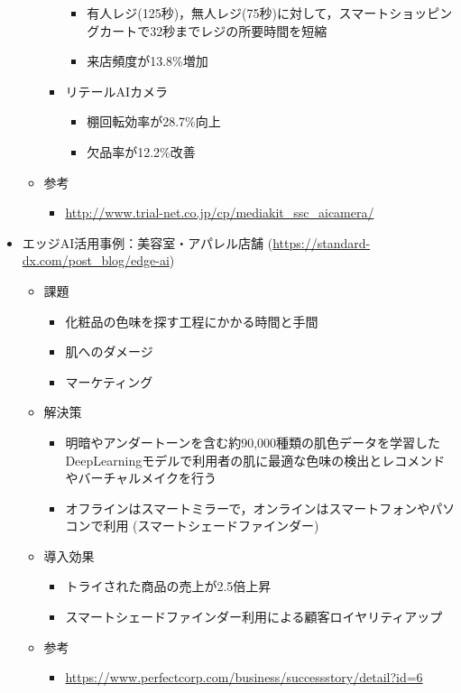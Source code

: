 \begin{itemize}
\begin{itemize}
\begin{itemize}
\begin{itemize}
				\item 有人レジ(125秒)，無人レジ(75秒)に対して，スマートショッピングカートで32秒までレジの所要時間を短縮
				\item 来店頻度が13.8\%増加
			\end{itemize}
			\item リテールAIカメラ
			\begin{itemize}
				\item 棚回転効率が28.7\%向上
				\item 欠品率が12.2\%改善
			\end{itemize}
		\end{itemize}
		\item 参考
		\begin{itemize}
			\item \url{http://www.trial-net.co.jp/cp/mediakit_ssc_aicamera/}
		\end{itemize}
	\end{itemize}
	\item エッジAI活用事例：美容室・アパレル店舗 (\url{https://standard-dx.com/post_blog/edge-ai})
	\begin{itemize}
		\item 課題
		\begin{itemize}
			\item 化粧品の色味を探す工程にかかる時間と手間
			\item 肌へのダメージ
			\item マーケティング
		\end{itemize}
		\item 解決策
		\begin{itemize}
			\item 明暗やアンダートーンを含む約90,000種類の肌色データを学習したDeepLearningモデルで利用者の肌に最適な色味の検出とレコメンドやバーチャルメイクを行う
			\item オフラインはスマートミラーで，オンラインはスマートフォンやパソコンで利用 (スマートシェードファインダー)
		\end{itemize}
		\item 導入効果
		\begin{itemize}
			\item トライされた商品の売上が2.5倍上昇
			\item スマートシェードファインダー利用による顧客ロイヤリティアップ
		\end{itemize}
		\item 参考
		\begin{itemize}
			\item \url{https://www.perfectcorp.com/business/successstory/detail?id=6}

\end{itemize}
\end{itemize}
\end{itemize}
